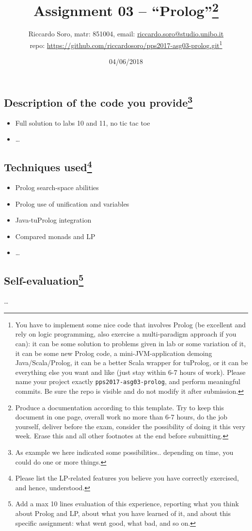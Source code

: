 \documentclass[10pt,english]{article}
\title{\vspace{-70pt}Assignment 03 -- ``Prolog''\footnote{Produce a documentation according to this template. Try to keep this document in one page, overall work no more than 6-7 hours, do the job yourself, deliver before the exam, consider the possibility of doing it this very week. Erase this and all other footnotes at the end before submitting.}}
\author{Riccardo Soro, matr: 851004, email: {\url{riccardo.soro@studio.unibo.it}}\\ repo: {\url{https://github.com/riccardosoro/pps2017-asg03-prolog.git}}\footnote{You have to implement some nice code that involves Prolog (be excellent and rely on logic programming, also exercise a multi-paradigm approach if you can): it can be some solution to problems given in lab or some variation of it, it can be some new Prolog code, a mini-JVM-application demoing Java/Scala/Prolog, it can be a better Scala wrapper for tuProlog, or it can be everything else you want and like (just stay within 6-7 hours of work). Please name your project exactly \texttt{pps2017-asg03-prolog}, and perform meaningful commits. Be sure the repo is visible and do not modify it after submission.}}
\date{04/06/2018}
\begin{document}
\maketitle
\vspace{-30pt}

\subsection*{Description of the code you provide\footnote{As example we here indicated some possibilities.. depending on time, you could do one or more things.}}

\begin{itemize}
 \item Full solution to labs 10 and 11, no tic tac toe
 \item \ldots
\end{itemize}

\subsection*{Techniques used\footnote{Please list the LP-related features you believe you have correctly exercised, and hence, understood.}}

\begin{itemize}
 \item Prolog search-space abilities
 \item Prolog use of unification and variables
 \item Java-tuProlog integration
 \item Compared monads and LP
 \item \ldots
\end{itemize}

\subsection*{Self-evaluation\footnote{Add a max 10 lines evaluation of this experience, reporting what you think about Prolog and LP, about what you have learned of it, and about this specific assignment: what went good, what bad, and so on.}}

\ldots 
 
\end{document}
